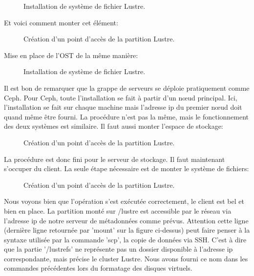 \documentclass[12pt]{article}
\begin{document}
\begin{figure}[H]
\caption{Installation de système de fichier Lustre.}
\label{fig:identification}
\end{figure}

Et voici comment monter cet élément:

\begin{figure}[H]
\caption{Création d'un point d'accès de la partition Lustre.}
\label{fig:identification}
\end{figure}

Mise en place de l'OST de la même manière:

\begin{figure}[H]
\caption{Installation de système de fichier Lustre.}
\label{fig:identification}
\end{figure}

Il est bon de remarquer que la grappe de serveurs se déploie pratiquement comme Ceph. Pour Ceph, toute l'installation se fait à partir d'un nœud principal. Ici, l'installation se fait sur chaque machine mais l'adresse ip du premier nœud doit quand même être fourni. La procédure n'est pas la même, mais le fonctionnement des deux systèmes est similaire. Il faut aussi monter l'espace de stockage:

\begin{figure}[H]
\caption{Création d'un point d'accès de la partition Lustre.}
\label{fig:identification}
\end{figure}

La procédure est donc fini pour le serveur de stockage. Il faut maintenant s'occuper du client. La seule étape nécessaire est de monter le système de fichiers:

\begin{figure}[H]
\caption{Création d'un point d'accès de la partition Lustre.}
\label{fig:identification}
\end{figure}

Nous voyons bien que l'opération s'est exécutée correctement, le client est bel et bien en place. La partition monté sur /lustre est accessible par le réseau via l'adresse ip de notre serveur de métadonnées comme prévus. Attention cette ligne (dernière ligne retournée par 'mount' sur la figure ci-dessus) peut faire penser à la syntaxe utilisée par la commande 'scp', la copie de données via SSH. C'est à dire que la partie '/lustrefs' ne représente pas un dossier disponible à l'adresse ip correspondante, mais précise le cluster Lustre. Nous avons fourni ce nom dans les commandes précédentes lors du formatage des disques virtuels. 
\end{document}
